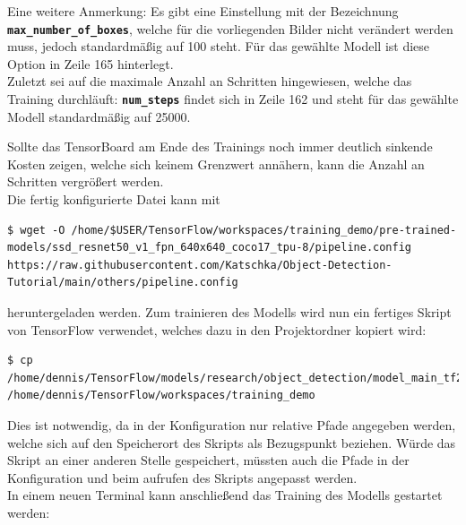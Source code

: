 \documentclass[12pt, oneside]{article}
\begin{document}
Eine weitere Anmerkung: Es gibt eine Einstellung mit der Bezeichnung \textbf{\texttt{max\_number\_of\_boxes}}, welche für die vorliegenden Bilder nicht verändert werden muss, jedoch standardmäßig auf 100 steht. Für das gewählte Modell ist diese Option in Zeile 165 hinterlegt.\\

Zuletzt sei auf die maximale Anzahl an Schritten hingewiesen, welche das Training durchläuft: \textbf{\texttt{num\_steps}} findet sich in Zeile 162 und steht für das gewählte Modell standardmäßig auf 25000.

Sollte das TensorBoard am Ende des Trainings noch immer deutlich sinkende Kosten zeigen, welche sich keinem Grenzwert annähern, kann die Anzahl an Schritten vergrößert werden.\\

Die fertig konfigurierte Datei kann mit

\begin{verbatim}
$ wget -O /home/$USER/TensorFlow/workspaces/training_demo/pre-trained-models/ssd_resnet50_v1_fpn_640x640_coco17_tpu-8/pipeline.config https://raw.githubusercontent.com/Katschka/Object-Detection-Tutorial/main/others/pipeline.config
\end{verbatim}
heruntergeladen werden. Zum trainieren des Modells wird nun ein fertiges Skript von TensorFlow verwendet, welches dazu in den Projektordner kopiert wird:

\begin{verbatim}
$ cp /home/dennis/TensorFlow/models/research/object_detection/model_main_tf2.py /home/dennis/TensorFlow/workspaces/training_demo
\end{verbatim}
Dies ist notwendig, da in der Konfiguration nur relative Pfade angegeben werden, welche sich auf den Speicherort des Skripts als Bezugspunkt beziehen. Würde das Skript an einer anderen Stelle gespeichert, müssten auch die Pfade in der Konfiguration und beim aufrufen des Skripts angepasst werden.\\

In einem neuen Terminal kann anschließend das Training des Modells gestartet werden:
\end{document}
